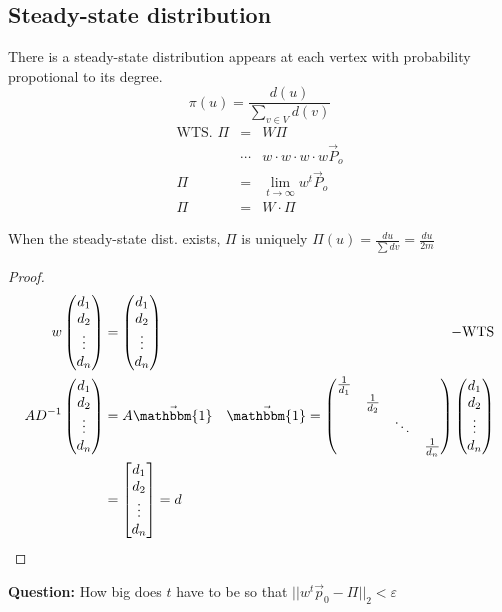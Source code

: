 \documentclass[12pt]{article}
\begin{document}
\subsection{Steady-state distribution}
There is a steady-state distribution appears at each vertex with probability propotional to its degree.
$$\pi(u) = \frac{d(u)}{\sum_{v\in V}d(v)}$$
\begin{eqnarray*}
	\text{WTS. } \Pi &=& W\Pi\\
	&\cdots& w \cdot w\cdot w\cdot w\vec{P}_o\\
	\Pi &=& \lim _{t \to \infty} w^t \vec{P}_o\\
	\Pi &=& W \cdot \Pi
\end{eqnarray*}
\begin{lemma} When the steady-state dist. exists, $\Pi$ is uniquely $\Pi(u)=\frac{du}{\sum dv}=\frac{du}{2m}$
\end{lemma}
\begin{proof}
	\begin{align*}
	w\left(\begin{matrix}
		d_1\\
		d_2\\
		\vdots\\
		d_n\\
	\end{matrix}\right)
	&=\left(\begin{matrix}
	d_1\\
	d_2\\
	\vdots\\
	d_n\\
	\end{matrix}\right)
	 &-\text{WTS}\\
	AD^{-1}\left(\begin{matrix}
	d_1\\
	d_2\\
	\vdots\\
	d_n\\
	\end{matrix}\right)
	&=A\vec{\mathbbm{1}}
	&\vec{\mathbbm{1}} =  \left(\begin{matrix}
	\frac{1}{d_1} &  & &\\
	&\frac{1}{d_2}  & &\\
	& &\ddots &\\
	&&&\frac{1}{d_n}
	\end{matrix}\right)
	\left(\begin{matrix}
	d_1\\
	d_2\\
	\vdots\\
	d_n\\
	\end{matrix}\right)\\
	&=\begin{bmatrix}
	d_1\\
	d_2\\
	\vdots\\
	d_n\\
	\end{bmatrix} = d
	\end{align*}
\end{proof}
\textbf{Question:} How big does $t$ have to be so that $||w^t\vec{p}_0-\Pi||_2 < \varepsilon$
\end{document}
